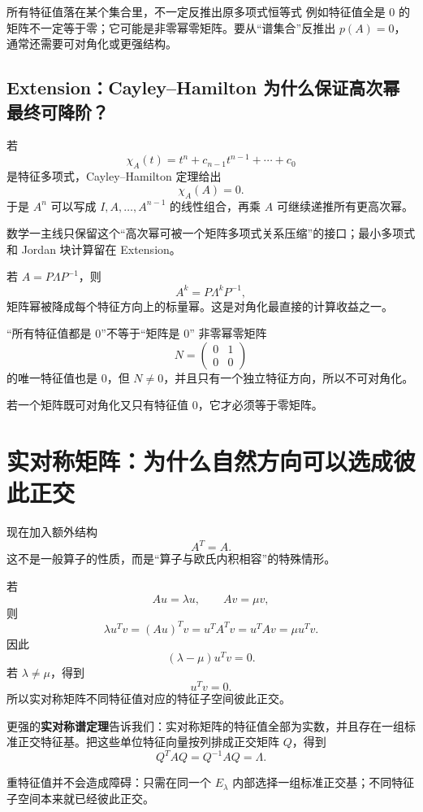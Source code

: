 \documentclass[11pt,a4paper]{ctexart}
\newcommand{\kw}[1]{\textbf{\color{deep}#1}}
\begin{document}
\begin{warnbox}{所有特征值落在某个集合里，不一定反推出原多项式恒等式}
例如特征值全是 $0$ 的矩阵不一定等于零；它可能是非零幂零矩阵。要从“谱集合”反推出 $p(A)=0$，通常还需要可对角化或更强结构。
\end{warnbox}

\subsection{Extension：Cayley--Hamilton 为什么保证高次幂最终可降阶？}
若
\[
\chi_A(t)=t^n+c_{n-1}t^{n-1}+\cdots+c_0
\]
是特征多项式，Cayley--Hamilton 定理给出
\[
\chi_A(A)=0.
\]
于是 $A^n$ 可以写成 $I,A,\dots,A^{n-1}$ 的线性组合，再乘 $A$ 可继续递推所有更高次幂。

数学一主线只保留这个“高次幂可被一个矩阵多项式关系压缩”的接口；最小多项式和 Jordan 块计算留在 Extension。

若 $A=P\Lambda P^{-1}$，则
\[
\boxed{A^k=P\Lambda^kP^{-1},}
\]
矩阵幂被降成每个特征方向上的标量幂。这是对角化最直接的计算收益之一。

\begin{warnbox}{“所有特征值都是 0”不等于“矩阵是 0”}
非零幂零矩阵
\[
N=\begin{pmatrix}0&1\\0&0\end{pmatrix}
\]
的唯一特征值也是 $0$，但 $N\neq0$，并且只有一个独立特征方向，所以不可对角化。

若一个矩阵既可对角化又只有特征值 $0$，它才必须等于零矩阵。
\end{warnbox}

\section{实对称矩阵：为什么自然方向可以选成彼此正交}

现在加入额外结构
\[
A^T=A.
\]
这不是一般算子的性质，而是“算子与欧氏内积相容”的特殊情形。

若
\[
Au=\lambda u,
\qquad
Av=\mu v,
\]
则
\[
\lambda u^Tv
=(Au)^Tv
=u^TA^Tv
=u^TAv
=\mu u^Tv.
\]
因此
\[
(\lambda-\mu)u^Tv=0.
\]
若 $\lambda\neq\mu$，得到
\[
\boxed{u^Tv=0.}
\]
所以实对称矩阵不同特征值对应的特征子空间彼此正交。

更强的\kw{实对称谱定理}告诉我们：实对称矩阵的特征值全部为实数，并且存在一组标准正交特征基。把这些单位特征向量按列排成正交矩阵 $Q$，得到
\[
\boxed{Q^TAQ=Q^{-1}AQ=\Lambda.}
\]

重特征值并不会造成障碍：只需在同一个 $E_\lambda$ 内部选择一组标准正交基；不同特征子空间本来就已经彼此正交。
\end{document}

